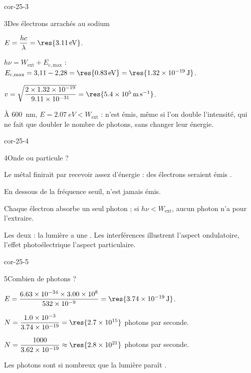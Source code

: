 \begin{blocLivre}{cor-25-3}
\begin{corrige}{3}{Des électrons arrachés au sodium}
\begin{questions}
\item $E=\dfrac{hc}{\lambda}=\res{\qty{3,11}{eV}}$.
\item $h\nu=W_\mathrm{ext}+E_\mathrm{c,max}$ : $E_\mathrm{c,max}=3{,}11-2{,}28=\res{\qty{0,83}{eV}}=\res{\qty{1,32e-19}{J}}$.
\item $v=\sqrt{\dfrac{2\times\num{1.32e-19}}{\num{9.11e-31}}}=\res{\qty{5,4e5}{m.s^{-1}}}$.
\item À \qty{600}{nm}, $E=\qty{2,07}{eV}<W_\mathrm{ext}$ :  n'est émis, même si l'on double l'intensité, qui ne
fait que doubler le nombre de photons, sans changer leur énergie.
\end{questions}
\end{corrige}
\end{blocLivre}
\begin{blocLivre}{cor-25-4}
\begin{corrige}{4}{Onde ou particule ?}
\begin{questions}
\item Le métal finirait par recevoir assez d'énergie : des électrons seraient émis .
\item En dessous de la fréquence seuil,  n'est jamais émis.
\item Chaque électron absorbe un seul photon ; si $h\nu<W_\mathrm{ext}$, aucun photon n'a  pour l'extraire.
\item Les deux : la lumière a une . Les interférences illustrent l'aspect ondulatoire, l'effet
photoélectrique l'aspect particulaire.
\end{questions}
\end{corrige}
\end{blocLivre}
\begin{blocLivre}{cor-25-5}
\begin{corrige}{5}{Combien de photons ?}
\begin{questions}
\item $E=\dfrac{\num{6.63e-34}\times\num{3.00e8}}{\num{532e-9}}=\res{\qty{3,74e-19}{J}}$.
\item $N=\dfrac{\num{1.0e-3}}{\num{3.74e-19}}=\res{\num{2.7e15}}$ photons par seconde.
\item $N=\dfrac{1000}{\num{3.62e-19}}\approx\res{\num{2.8e21}}$ photons par seconde.
\item Les photons sont si nombreux que la lumière paraît .
\end{questions}
\end{corrige}
\end{blocLivre}
